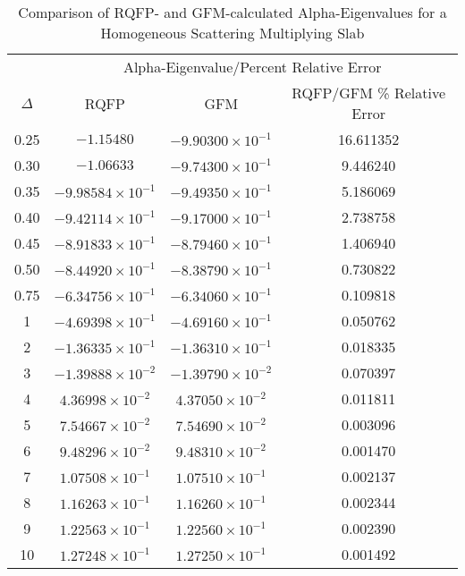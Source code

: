 \begin{table*}[!htbp]
\centering{}
\caption{Comparison of RQFP- and GFM-calculated Alpha-Eigenvalues for a Homogeneous Scattering Multiplying Slab}
\label{table:CompHomogMult}
\begin{tabular}{@{}cccc@{}}\toprule
& \multicolumn{3}{c}{Alpha-Eigenvalue/Percent Relative Error} \\
\cmidrule{2-4} $\Delta$ & RQFP & GFM & RQFP/GFM \% Relative Error \\
\midrule
0.25 & $-1.15480 $ & $-9.90300 \times 10^{-1}$ & 16.611352 \\ 
0.30 & $-1.06633 $ & $-9.74300 \times 10^{-1}$ & 9.446240 \\ 
0.35 & $-9.98584 \times 10^{-1}$ & $-9.49350 \times 10^{-1}$ & 5.186069 \\ 
0.40 & $-9.42114 \times 10^{-1}$ & $-9.17000 \times 10^{-1}$ & 2.738758 \\ 
0.45 & $-8.91833 \times 10^{-1}$ & $-8.79460 \times 10^{-1}$ & 1.406940 \\ 
0.50 & $-8.44920 \times 10^{-1}$ & $-8.38790 \times 10^{-1}$ & 0.730822 \\ 
0.75 & $-6.34756 \times 10^{-1}$ & $-6.34060 \times 10^{-1}$ & 0.109818 \\ 
1 & $-4.69398 \times 10^{-1}$ & $-4.69160 \times 10^{-1}$ & 0.050762 \\ 
2 & $-1.36335 \times 10^{-1}$ & $-1.36310 \times 10^{-1}$ & 0.018335 \\ 
3 & $-1.39888 \times 10^{-2}$ & $-1.39790 \times 10^{-2}$ & 0.070397 \\ 
4 & $4.36998 \times 10^{-2}$ & $4.37050 \times 10^{-2}$ & 0.011811 \\ 
5 & $7.54667 \times 10^{-2}$ & $7.54690 \times 10^{-2}$ & 0.003096 \\ 
6 & $9.48296 \times 10^{-2}$ & $9.48310 \times 10^{-2}$ & 0.001470 \\ 
7 & $1.07508 \times 10^{-1}$ & $1.07510 \times 10^{-1}$ & 0.002137 \\ 
8 & $1.16263 \times 10^{-1}$ & $1.16260 \times 10^{-1}$ & 0.002344 \\ 
9 & $1.22563 \times 10^{-1}$ & $1.22560 \times 10^{-1}$ & 0.002390 \\ 
10 & $1.27248 \times 10^{-1}$ & $1.27250 \times 10^{-1}$ & 0.001492 \\ 

\end{tabular}
\end{table*}
